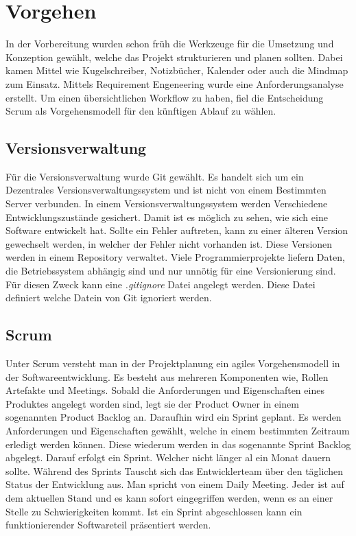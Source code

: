 \chapter{Vorgehen}
In der Vorbereitung wurden schon früh die Werkzeuge für die Umsetzung und Konzeption gewählt, welche das Projekt strukturieren und planen sollten. Dabei kamen Mittel wie Kugelschreiber, Notizbücher, Kalender oder auch die Mindmap zum Einsatz. Mittels Requirement Engeneering wurde eine Anforderungsanalyse erstellt. Um einen übersichtlichen Workflow zu haben, fiel die Entscheidung Scrum als Vorgehensmodell für den künftigen Ablauf zu wählen.

\section{Versionsverwaltung}
\label{cha:versionsverwaltung}
Für die Versionsverwaltung wurde Git gewählt. Es handelt sich um ein Dezentrales Versionsverwaltungssystem und ist nicht von einem Bestimmten Server verbunden. In einem Versionsverwaltungssystem werden Verschiedene Entwicklungszustände gesichert. Damit ist es möglich zu sehen, wie sich eine Software entwickelt hat. Sollte ein Fehler auftreten, kann zu einer älteren Version gewechselt werden, in welcher der Fehler nicht vorhanden ist. Diese Versionen werden in einem Repository verwaltet. Viele Programmierprojekte liefern Daten, die Betriebssystem abhängig sind und nur unnötig für eine Versionierung sind. Für diesen Zweck kann eine \textit{.gitignore} Datei angelegt werden. Diese Datei definiert welche Datein von Git ignoriert werden.\autocite{git}



\section{Scrum}
\label{scrum}

Unter Scrum versteht man in der Projektplanung ein agiles Vorgehensmodell in der Softwareentwicklung. Es besteht aus mehreren Komponenten wie, Rollen Artefakte und Meetings. Sobald die Anforderungen und Eigenschaften eines Produktes angelegt worden sind, legt sie der Product Owner in einem sogenannten Product Backlog an. Daraufhin wird ein Sprint geplant. Es werden Anforderungen und Eigenschaften gewählt, welche in einem bestimmten Zeitraum erledigt werden können. Diese wiederum werden in das sogenannte Sprint Backlog abgelegt. Darauf erfolgt ein Sprint. Welcher nicht länger al ein Monat dauern sollte. Während des Sprints Tauscht sich das Entwicklerteam über den täglichen Status der Entwicklung aus. Man spricht von einem Daily Meeting. Jeder ist auf dem aktuellen Stand und es kann sofort eingegriffen werden, wenn es an einer Stelle zu Schwierigkeiten kommt. Ist ein Sprint abgeschlossen kann ein funktionierender Softwareteil präsentiert werden. \autocite{Niermann.2017}


